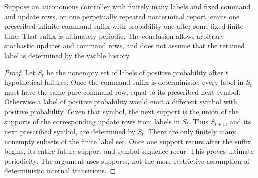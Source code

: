 \begin{lemma}
\label{lem:r80-finite-word-rigidity}
Suppose an autonomous controller with finitely many labels and
fixed command and update rows, on one perpetually repeated
nonterminal report, emits one prescribed infinite command suffix
with probability one after some fixed finite time.  That suffix is
ultimately periodic.  The conclusion allows arbitrary stochastic
updates and command rows, and does not assume that the retained
label is determined by the visible history.
\end{lemma}
\begin{proof}
Let $S_t$ be the nonempty set of labels of positive probability
after $t$ hypothetical failures.  Once the command suffix is
deterministic, every label in $S_t$ must have the same pure
command row, equal to its prescribed next symbol.  Otherwise a
label of positive probability would emit a different symbol
with positive probability.  Given that symbol, the next support
is the union of the supports of the corresponding update rows
from labels in $S_t$.  Thus $S_{t+1}$, and its next prescribed
symbol, are determined by $S_t$.  There are only finitely many
nonempty subsets of the finite label set.  Once one support
recurs after the suffix begins, its entire future support and
symbol sequence recur.  This proves ultimate periodicity.
The argument uses supports, not the more restrictive assumption
of deterministic internal transitions.
\end{proof}

